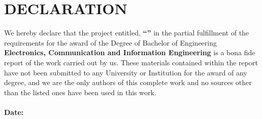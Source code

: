 \chapter*{DECLARATION}

We hereby declare that the project entitled, \textbf{``\cTitle''} in the partial fulfillment  of the requirements for the award of the Degree of Bachelor of Engineering \textbf{Electronics, Communication and Information Engineering} is a bona fide report of the work carried out by us. These materials contained within the report have not been submitted to any University or Institution for the award of any degree, and we are the only authors of this complete work and no sources other than the listed ones have been used in this work.\\[15pt]
\authorTable\\[20pt]
\textbf{Date:} \cDate
